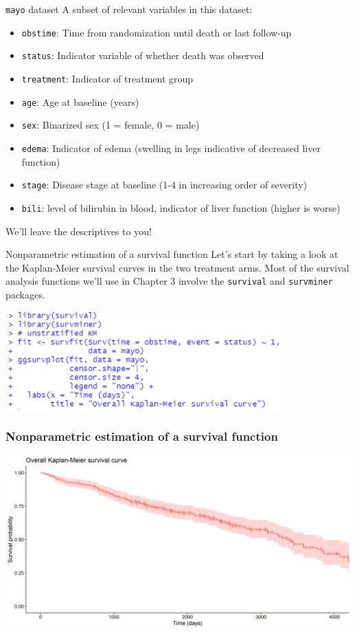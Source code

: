 \documentclass[10pt,t]{beamer}
\begin{document}
\begin{frame}{\texttt{mayo} dataset}
	A subset of relevant variables in this dataset:
	\begin{itemize}
		\item \texttt{obstime}: Time from randomization until death or last follow-up
		\item \texttt{status}: Indicator variable of whether death was observed
		\item \texttt{treatment}: Indicator of treatment group
		\item \texttt{age}: Age at baseline (years)
		\item \texttt{sex}: Binarized sex (1 = female, 0 = male)
		\item \texttt{edema}: Indicator of edema (swelling in legs indicative of decreased liver function)
		\item \texttt{stage}: Disease stage at baseline (1-4 in increasing order of severity)
		\item \texttt{bili}: level of bilirubin in blood, indicator of liver function (higher is worse) 
	\end{itemize}
	We'll leave the descriptives to you!
\end{frame}

\begin{frame}{Nonparametric estimation of a survival function}
	Let's start by taking a look at the Kaplan-Meier survival curves in the two treatment arms. Most of the survival analysis functions we'll use in Chapter 3 involve the \texttt{survival} and \texttt{survminer} packages. 
	\begin{center}
		\includegraphics[width=0.8\textwidth]{figs/KM_unstrat_code.png}
	\end{center}
\end{frame}

\begin{frame}
\frametitle{Nonparametric estimation of a survival function} 
\begin{center}
\includegraphics[width=\textwidth]{figs/KM_unstrat.png}
\end{center}
\end{frame}
\end{document}
